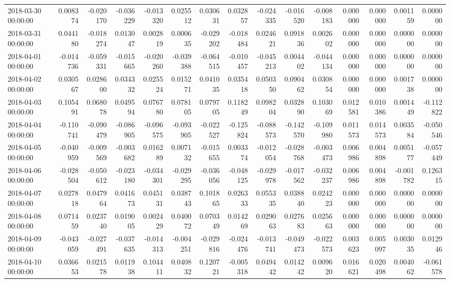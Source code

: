 \begin{tabular}{lrrrrrrrrrrrrrr}
2018-03-30 00:00:00 & 0.008374 & -0.020170 & -0.036229 & -0.013320 & 0.025512 & 0.030631 & 0.032857 & -0.024335 & -0.016520 & -0.008183 & 0.000000 & 0.000000 & 0.001159 & 0.000000 \\
2018-03-31 00:00:00 & 0.044180 & -0.018274 & 0.013047 & 0.002819 & 0.000635 & -0.029202 & -0.018484 & 0.024621 & 0.091836 & 0.002602 & 0.000000 & 0.000000 & 0.000000 & 0.000000 \\
2018-04-01 00:00:00 & -0.014736 & -0.059331 & -0.015665 & -0.020260 & -0.039388 & -0.064515 & -0.010457 & -0.045213 & 0.004402 & -0.044134 & 0.000000 & 0.000000 & 0.000000 & 0.000000 \\
2018-04-02 00:00:00 & 0.030567 & 0.028600 & 0.034332 & 0.025524 & 0.015271 & 0.041035 & 0.035418 & 0.050350 & 0.090462 & 0.030854 & 0.000000 & 0.000000 & 0.001738 & 0.000000 \\
2018-04-03 00:00:00 & 0.105491 & 0.068078 & 0.049594 & 0.076780 & 0.078105 & 0.079705 & 0.118249 & 0.098204 & 0.032890 & 0.103069 & 0.012581 & 0.010386 & 0.001449 & -0.112822 \\
2018-04-04 00:00:00 & -0.110741 & -0.090479 & -0.086905 & -0.096575 & -0.093905 & -0.022527 & -0.125824 & -0.088573 & -0.142570 & -0.109980 & 0.011573 & 0.014573 & 0.003584 & -0.050546 \\
2018-04-05 00:00:00 & -0.040959 & -0.009569 & -0.003682 & 0.016289 & 0.007132 & -0.015655 & 0.003374 & -0.012054 & -0.028768 & -0.003473 & 0.006986 & 0.004898 & 0.005177 & -0.057449 \\
2018-04-06 00:00:00 & -0.028504 & -0.050612 & -0.023180 & -0.034301 & -0.029295 & -0.036056 & -0.048125 & -0.029978 & -0.017562 & -0.032237 & 0.006986 & 0.004898 & -0.001782 & 0.126315 \\
2018-04-07 00:00:00 & 0.027818 & 0.047964 & 0.041673 & 0.045131 & 0.038743 & 0.101865 & 0.026333 & 0.055335 & 0.038840 & 0.024223 & 0.000000 & 0.000000 & 0.000000 & 0.000000 \\
2018-04-08 00:00:00 & 0.071459 & 0.023740 & 0.019005 & 0.002429 & 0.040072 & 0.070349 & 0.014269 & 0.029063 & 0.027683 & 0.025663 & 0.000000 & 0.000000 & 0.000000 & 0.000000 \\
2018-04-09 00:00:00 & -0.043059 & -0.027491 & -0.037635 & -0.014313 & -0.004251 & -0.029816 & -0.024476 & -0.013741 & -0.049473 & -0.022573 & 0.003623 & 0.005097 & 0.003035 & 0.012946 \\
2018-04-10 00:00:00 & 0.036653 & 0.021578 & 0.011938 & 0.104411 & 0.040832 & 0.120721 & -0.005318 & 0.049442 & 0.014242 & 0.009620 & 0.016621 & 0.020498 & 0.004062 & -0.061578 \\

\end{tabular}
